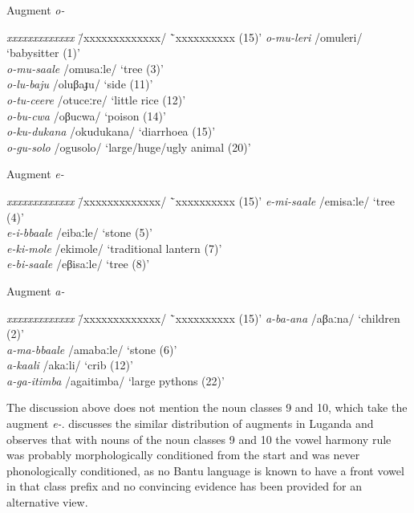 \ea \label{ex-vowel-harmony-augment}
\begin{xlist}

\ex \label{ex-vowel-harmony-augmentO}
 Augment  \textit{o-}
 \begin{tabbing}
	 \textit{xxxxxxxxxxxxx} \= /xxxxxxxxxxxxx/ \=`xxxxxxxxxx (15)'\kill
	 \textit{o-mu-leri} \> /omuleri/ \> `babysitter (1)'\\
	 \textit{o-mu-saale} \> /omusaːle/ \>  `tree (3)'\\
	 \textit{o-lu-baju} \>/oluβaɟu/ \>`side (11)'\\
	 \textit{o-tu-ceere}\> /otuceːre/ \>`little rice (12)'\\
	 \textit{o-bu-cwa} \>/oβucwa/ \>`poison (14)'\\
	 \textit{o-ku-dukana} \> /okudukana/ \>`diarrhoea (15)'\\
	 \textit{o-gu-solo} \>/ogusolo/ \>`large/huge/ugly animal (20)'	
 \end{tabbing}
\ex \label{ex-vowel-harmony-augmentE}
Augment  \textit{e-}
 \begin{tabbing}
	 \textit{xxxxxxxxxxxxx} \= /xxxxxxxxxxxxx/ \=`xxxxxxxxxx (15)'\kill
	 \textit{e-mi-saale} \> /emisaːle/ \> `tree (4)'\\
	 \textit{e-i-bbaale} \>/eibaːle/ \>`stone (5)'\\
	 \textit{e-ki-mole} \> /ekimole/ \>`traditional lantern (7)'\\
	 \textit{e-bi-saale} \>/eβisaːle/ \>`tree (8)'
\end{tabbing}	

\ex \label{ex-vowel-harmony-augmentA}
Augment  \textit{a-}
\begin{tabbing}
	 \textit{xxxxxxxxxxxxx} \= /xxxxxxxxxxxxx/ \=`xxxxxxxxxx (15)'\kill
 \textit{a-ba-ana} \> /aβaːna/  \>`children (2)'\\
	 \textit{a-ma-bbaale} \> /amabaːle/  \>`stone (6)'\\
	 \textit{a-kaali}  \>/akaːli/  \>`crib (12)'\\
	 \textit{a-ga-itimba}  \>/agaitimba/  \> ‘large  pythons (22)’
\end{tabbing}	
\end{xlist}
\z

The discussion above does not mention the noun classes 9 and 10, which take the augment  \textit{e-}. 
\citet[265–266]{Katamba1984Nonlinear} discusses the similar distribution of augments in Luganda and observes that with nouns of the noun classes 9 and 10 the vowel harmony rule was probably morphologically conditioned from the start and was never phonologically conditioned, as no Bantu language is known to have a front vowel in that class prefix and no convincing evidence has been provided for an alternative view. 


